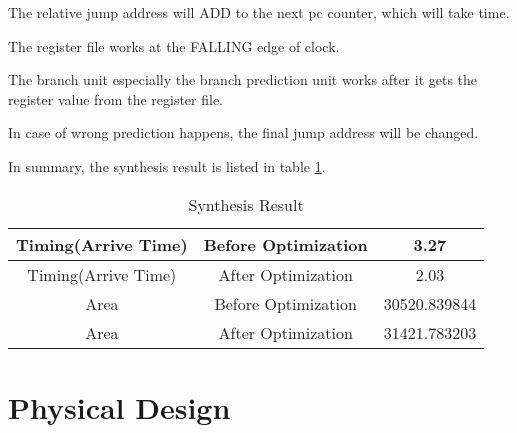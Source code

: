 \begin{description}
  \item The relative jump address will ADD to the next pc counter, which will take time.
  \item The register file works at the FALLING edge of clock.
  \item The branch unit especially the branch prediction unit works after it gets the register value from the register file.
  \item In case of wrong prediction happens, the final jump address will be changed.
\end{description}

In summary, the synthesis result is listed in table \ref{tab:syn}.
\begin{table}[!ht]
\centering
\caption{Synthesis Result}
\label{tab:syn}
\begin{tabular}{|c|c|c|}
\hline
Timing(Arrive Time) & Before Optimization & 3.27 \\
\hline
Timing(Arrive Time) & After Optimization & 2.03 \\
\hline
Area & Before Optimization & 30520.839844 \\
\hline
Area & After Optimization & 31421.783203 \\
\hline
\end{tabular}
\end{table}

\chapter[Physical Design]{Physical Design}

